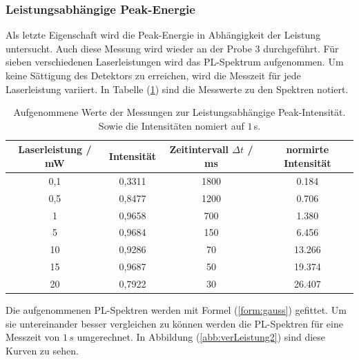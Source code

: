 \subsubsection{Leistungsabh\"{a}ngige Peak-Energie}
Als letzte Eigenschaft wird die Peak-Energie in Abh\"{a}ngigkeit der Leistung untersucht.
Auch diese Messung wird wieder an der Probe 3 durchgef\"{u}hrt.
F\"{u}r sieben verschiedenen Laserleistungen wird das PL-Spektrum aufgenommen.
Um keine S\"{a}ttigung des Detektors zu erreichen, wird die Messzeit f\"{u}r jede Laserleistung variiert.
In Tabelle (\ref{tab:1c}) sind die Messwerte zu den Spektren notiert.
\begin{table}
	\centering
	\caption{Aufgenommene Werte der Messungen zur Leistungsabh\"{a}ngige Peak-Intensit\"{a}t. Sowie die Intensit\"{a}ten nomiert auf $1 \, $s. }
\begin{tabular}{|cccc|}
	\hline
	{Laserleistung / mW} & {Intensit\"{a}t} & {Zeitintervall $\Delta t$ / ms} & {normirte Intensit\"{a}t} \\
	\hline
	0,1	&	0,3311	&	1800 & 0.184 \\
	0,5	&	0,8477	&	1200 & 0.706 \\
	1	&	0,9658	&	700	& 1.380 \\
	5	&	0,9684	&	150	& 6.456 \\
	10	&	0,9286	&	70	& 13.266 \\
	15	&	0,9687	&	50	& 19.374 \\
	20	&	0,7922	&	30	& 26.407 \\
	\hline
\end{tabular}
\label{tab:1c}
\end{table}
Die aufgenommenen PL-Spektren werden mit Formel (\ref{form:gauss}) gefittet.
Um sie untereinander besser vergleichen zu k\"{o}nnen werden die PL-Spektren f\"{u}r eine Messzeit von $1 \, s$ umgerechnet.
In Abbildung (\ref{abb:verLeistung2}) sind diese Kurven zu sehen.

